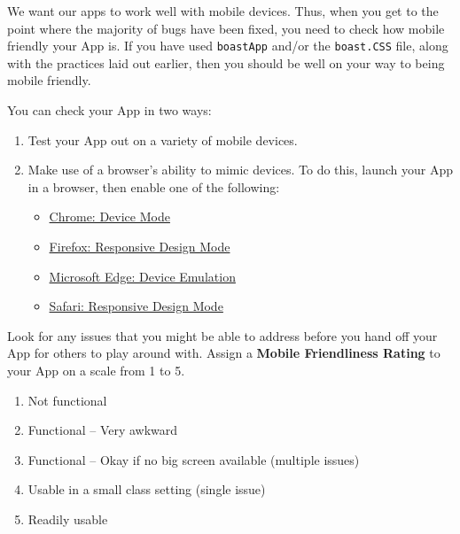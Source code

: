 \documentclass[
]{book}
\providecommand{\tightlist}{%
  \setlength{\itemsep}{0pt}\setlength{\parskip}{0pt}}
\begin{document}
We want our apps to work well with mobile devices. Thus, when you get to the point where the majority of bugs have been fixed, you need to check how mobile friendly your App is. If you have used \texttt{boastApp} and/or the \texttt{boast.CSS} file, along with the practices laid out earlier, then you should be well on your way to being mobile friendly.

You can check your App in two ways:

\begin{enumerate}
\def\labelenumi{\arabic{enumi}.}
\tightlist
\item
  Test your App out on a variety of mobile devices.
\item
  Make use of a browser's ability to mimic devices. To do this, launch your App in a browser, then enable one of the following:

  \begin{itemize}
  \tightlist
  \item
    \href{https://developers.google.com/web/tools/chrome-devtools/device-mode/\#viewport}{Chrome: Device Mode}
  \item
    \href{https://developer.mozilla.org/en-US/docs/Tools/Responsive_Design_Mode}{Firefox: Responsive Design Mode}
  \item
    \href{https://docs.microsoft.com/en-us/microsoft-edge/devtools-guide/emulation}{Microsoft Edge: Device Emulation}
  \item
    \href{https://support.apple.com/en-gb/guide/safari-developer/dev84bd42758/mac}{Safari: Responsive Design Mode}
  \end{itemize}
\end{enumerate}

Look for any issues that you might be able to address before you hand off your App for others to play around with. Assign a \textbf{Mobile Friendliness Rating} to your App on a scale from 1 to 5.

\begin{enumerate}
\def\labelenumi{\arabic{enumi}.}
\tightlist
\item
  Not functional
\item
  Functional -- Very awkward
\item
  Functional -- Okay if no big screen available (multiple issues)
\item
  Usable in a small class setting (single issue)
\item
  Readily usable
\end{enumerate}
\end{document}
